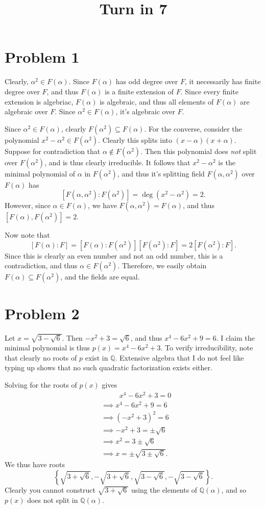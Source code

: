 \documentclass[11pt, letterpaper]{article}
\title{Turn in 7}
\begin{document}
\makeproblem
\section*{Problem 1}
Clearly, $\alpha ^2\in F(\alpha )$. Since $F(\alpha )$ has odd degree over $F$, it necessarily has finite degree over $F$, and thus $F(\alpha )$ is a finite extension of $F$. Since every finite extension is algebriac, $F(\alpha )$ is algebraic, and thus all elements of $F(\alpha )$ are algebraic over $F$. Since $\alpha ^2\in F(\alpha )$, it's algebraic over $F$.

Since $\alpha ^2\in F(\alpha )$, clearly $F(\alpha ^2)\subseteq F(\alpha )$. For the converse, consider the polynomial $x^2-\alpha ^2\in F(\alpha ^2)$. Clearly this splits into $(x-\alpha )(x+\alpha )$. Suppose for contradiction that $\alpha \notin F(\alpha ^2)$. Then this polynomial does \emph{not} split over $F(\alpha^2 )$, and is thus clearly irreducible. It follows that $x^2-\alpha ^2$ is the minimal polynomial of $\alpha$ in $F(\alpha ^2)$, and thus it's splitting field $F(\alpha ,\alpha ^2)$ over $F(\alpha )$ has
\[
	\left[ F(\alpha ,\alpha ^2):F(\alpha ^2) \right] =\operatorname{deg} (x^2-\alpha ^2)=2
.\]
However, since $\alpha \in F(\alpha )$, we have $F(\alpha ,\alpha ^2)=F(\alpha )$, and thus $\left[ F(\alpha ),F(\alpha ^2) \right] =2$.

Now note that
\[
	\left[ F(\alpha ):F \right] =\left[ F(\alpha ):F(\alpha ^2) \right] \left[ F(\alpha ^2):F \right] =2\left[ F(\alpha ^2):F \right] 
.\]
Since this is clearly an even number and not an odd number, this is a contradiction, and thus $\alpha \in F(\alpha ^2)$. Therefore, we easily obtain $F(\alpha )\subseteq F(\alpha ^2)$, and the fields are equal.

\section*{Problem 2}
Let $x=\sqrt{3-\sqrt{6} } $. Then $-x^2+3=\sqrt{6} $, and thus $x^4-6x^2+9=6$. I claim the minimal polynomial is thus $p(x)=x^4-6x^2+3$. To verify irreducibility, note that clearly no roots of $p$ exist in $\mathbb{Q} $. Extensive algebra that I do not feel like typing up shows that no such quadratic factorization exists either.

Solving for the roots of $p(x)$ gives
\begin{align*}
	&\qquad\;\; x^4-6x^2+3=0\\
	&\implies x^4-6x^2+9=6\\
	&\implies \left(-x^2+3\right)^2=6\\
	&\implies -x^2+3=\pm\sqrt{6} \\
	&\implies x^2=3\pm\sqrt{6} \\
	&\implies x=\pm\sqrt{3\pm\sqrt{6} } 
.\end{align*}
We thus have roots
\[
	\left\{ \sqrt{3+\sqrt{6} } ,-\sqrt{3+\sqrt{6} } ,\sqrt{3-\sqrt{6} } ,-\sqrt{3-\sqrt{6}}  \right\} 
.\]
Clearly you cannot construct $\sqrt{3+\sqrt{6} } $ using the elements of $\mathbb{Q} (\alpha)$, and so $p(x)$ does not split in $\mathbb{Q} (\alpha )$.
\end{document}

